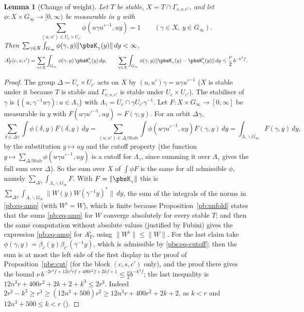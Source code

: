 \documentclass[10pt]{amsart}
\newtheorem{lemma}[theorem]{Lemma}
\theoremstyle{definition}
\theoremstyle{remark}
\begin{document}
\begin{lemma}[Change of weight]\label{pbs:weight}
Let $T$ be stable, $X=T\cap\Gamma_{c,s,c'}$, and let $\phi\colon X\times G_\infty\to[0,\infty)$ be
measurable in $y$ with
\[
\sum_{(u,u')\in U_c\times U_{c'}}\phi(u\gamma u'^{-1},uy)=1\qquad(\gamma\in X,\ y\in G_\infty).
\]
Then $\sum_{\gamma\in X}\int_{G_\infty}\phi(\gamma,y)\|\pbsK_\gamma(y)\|\,dy<\infty$,
\[
A^\flat_T(c,s,c')=\sum_{\gamma\in X}\int_{G_\infty}\phi(\gamma,y)\,\pbsK^\flat_\gamma(y)\,dy,\qquad
\sum_{\gamma\in X}\int_{G_\infty}\phi(\gamma,y)\|\pbsK_\gamma(y)-\pbsK^\flat_\gamma(y)\|\,dy\le
\frac\nu2\,b^{-k^3f}.
\]
\end{lemma}
\begin{proof}
The group $\Delta=U_c\times U_{c'}$ acts on $X$ by $(u,u')\gamma=u\gamma u'^{-1}$ ($X$ is stable
under it because $T$ is stable and $\Gamma_{c,s,c'}$ is stable under $U_c\times U_{c'}$). The
stabiliser of $\gamma$ is $\{(u,\gamma^{-1}u\gamma):u\in\Lambda_\gamma\}$ with $\Lambda_\gamma=U_c\cap
\gamma U_{c'}\gamma^{-1}$. Let $F\colon X\times G_\infty\to[0,\infty]$ be measurable in $y$ with
$F(u\gamma u'^{-1},uy)=F(\gamma,y)$. For an orbit $\Delta\gamma$,
\[
\sum_{\delta\in\Delta\gamma}\int\phi(\delta,y)F(\delta,y)\,dy=\sum_{(u,u')\in\Delta/\mathrm{Stab}}
\int\phi(u\gamma u'^{-1},uy)F(\gamma,y)\,dy=\int_{\Lambda_\gamma\backslash G_\infty}F(\gamma,y)\,dy,
\]
by the substitution $y\mapsto uy$ and the cutoff property (the function $y\mapsto\sum_{\Delta/
\mathrm{Stab}}\phi(u\gamma u'^{-1},uy)$ is a cutoff for $\Lambda_\gamma$, since summing it over
$\Lambda_\gamma$ gives the full sum over $\Delta$). So the sum over $X$ of $\int\phi F$ is the same
for all admissible $\phi$, namely $\sum_{\Delta\gamma}\int_{\Lambda_\gamma\backslash G_\infty}F$. With
$F=\|\pbsK_\gamma\|$ this is $\sum_{\Delta\gamma}\int_{\Lambda_\gamma\backslash G_\infty}\|W(y)W(\gamma^{-1}y)^*\|\,dy$,
the sum of the integrals of the norms in \eqref{pb:eq-amp} (with $W^\flat=W$), which is finite because
Proposition~\ref{pb:unfold} states that the sums \eqref{pb:eq-amp} for $W$ converge absolutely for every
stable $T$; and then the same computation without absolute values (justified by Fubini) gives the
expression \eqref{pb:eq-amp} for $A^\flat_T$, using $\|W^\flat\|\le\|W\|$. For the last claim take
$\phi(\gamma,y)=\beta_c(y)\beta_{c'}(\gamma^{-1}y)$, which is admissible by \eqref{pbs:eq-cutoff};
then the sum is at most the left side of the first display in the proof of
Proposition~\ref{pbe:cut} (for the block $(c,s,c')$ only), and the proof there gives the bound
$\nu\,b^{-2r^3f+12n^3rf+400r^2f+2kf+1}\le\frac\nu2b^{-k^3f}$; the last inequality is
$12n^3r+400r^2+2k+2+k^3\le2r^3$. Indeed $2r^3-k^3\ge r^3\ge(12n^3+500)r^2\ge12n^3r+400r^2+2k+2$,
as $k<r$ and $12n^3+500\le k<r$ ({\cite[Lemma~13.4(S7)(a)]{P46}}).
\end{proof}
\end{document}

